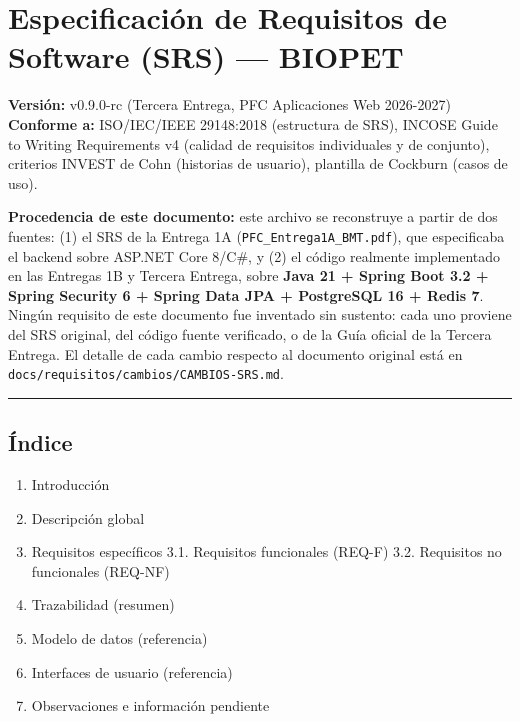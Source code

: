\documentclass[
]{article}
\author{}
\date{}
\providecommand{\tightlist}{%
  \setlength{\itemsep}{0pt}\setlength{\parskip}{0pt}}
\begin{document}
{
\setcounter{tocdepth}{3}
\tableofcontents
}
\hypertarget{especificaciuxf3n-de-requisitos-de-software-srs-biopet}{%
\section{Especificación de Requisitos de Software (SRS) ---
BIOPET}\label{especificaciuxf3n-de-requisitos-de-software-srs-biopet}}

\textbf{Versión:} v0.9.0-rc (Tercera Entrega, PFC Aplicaciones Web
2026-2027) \textbf{Conforme a:} ISO/IEC/IEEE 29148:2018 (estructura de
SRS), INCOSE Guide to Writing Requirements v4 (calidad de requisitos
individuales y de conjunto), criterios INVEST de Cohn (historias de
usuario), plantilla de Cockburn (casos de uso).

\textbf{Procedencia de este documento:} este archivo se reconstruye a
partir de dos fuentes: (1) el SRS de la Entrega 1A
(\texttt{PFC\_Entrega1A\_BMT.pdf}), que especificaba el backend sobre
ASP.NET Core 8/C\#, y (2) el código realmente implementado en las
Entregas 1B y Tercera Entrega, sobre \textbf{Java 21 + Spring Boot 3.2 +
Spring Security 6 + Spring Data JPA + PostgreSQL 16 + Redis 7}. Ningún
requisito de este documento fue inventado sin sustento: cada uno
proviene del SRS original, del código fuente verificado, o de la Guía
oficial de la Tercera Entrega. El detalle de cada cambio respecto al
documento original está en
\texttt{docs/requisitos/cambios/CAMBIOS-SRS.md}.

\begin{center}\rule{0.5\linewidth}{0.5pt}\end{center}

\hypertarget{uxedndice}{%
\subsection{Índice}\label{uxedndice}}

\begin{enumerate}
\def\labelenumi{\arabic{enumi}.}
\tightlist
\item
  Introducción
\item
  Descripción global
\item
  Requisitos específicos 3.1. Requisitos funcionales (REQ-F) 3.2.
  Requisitos no funcionales (REQ-NF)
\item
  Trazabilidad (resumen)
\item
  Modelo de datos (referencia)
\item
  Interfaces de usuario (referencia)
\item
  Observaciones e información pendiente
\end{enumerate}
\end{document}
